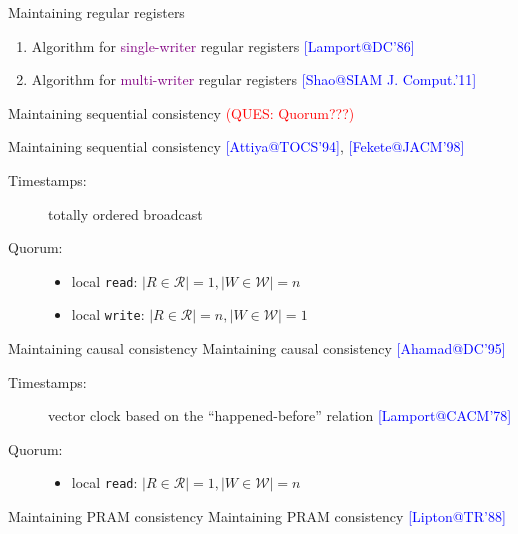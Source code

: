 \documentclass{beamer}
\makeatletter
\newcommand{\citeinbeamer}[3]{{\scriptsize{\textcolor{blue}{[#1@#2'#3]}}}}
\newcommand{\question}[1]{\textcolor{red}{(QUES: #1)}}
\newcommand{\largepurple}[1]{\textcolor{purple}{\large #1}}
\makeatother
\begin{document}
\begin{frame}{Maintaining regular registers}
  \begin{enumerate}
    \item Algorithm for \largepurple{single-writer} regular registers
    \citeinbeamer{Lamport}{DC}{86}

    \item Algorithm for \largepurple{multi-writer} regular registers
    \citeinbeamer{Shao}{SIAM J. Comput.}{11}
  \end{enumerate}
\end{frame}
\begin{frame}{Maintaining sequential consistency}
  \question{Quorum???}

  Maintaining sequential consistency \citeinbeamer{Attiya}{TOCS}{94},
  \citeinbeamer{Fekete}{JACM}{98}
  \begin{description}
    \item[Timestamps:] totally ordered broadcast
    \item[Quorum:] \hfill
      \begin{itemize}
        \item local \texttt{read}: $|R \in \mathcal{R}| = 1, |W \in \mathcal{W}|
        = n$
        \item local \texttt{write}: $|R \in \mathcal{R}| = n, |W \in
        \mathcal{W}| = 1$
      \end{itemize}
  \end{description}
\end{frame}
\begin{frame}{Maintaining causal consistency}
  Maintaining causal consistency \citeinbeamer{Ahamad}{DC}{95}
  \begin{description}
    \item[Timestamps:] vector clock based on the ``happened-before'' relation
    \citeinbeamer{Lamport}{CACM}{78}
    \item[Quorum:] \hfill
      \begin{itemize}
        \item local \texttt{read}: $|R \in \mathcal{R}| = 1, |W \in \mathcal{W}|
        = n$
      \end{itemize}
  \end{description}
\end{frame}
\begin{frame}{Maintaining PRAM consistency}
  Maintaining PRAM consistency \citeinbeamer{Lipton}{TR}{88}
\end{frame}
\end{document}
